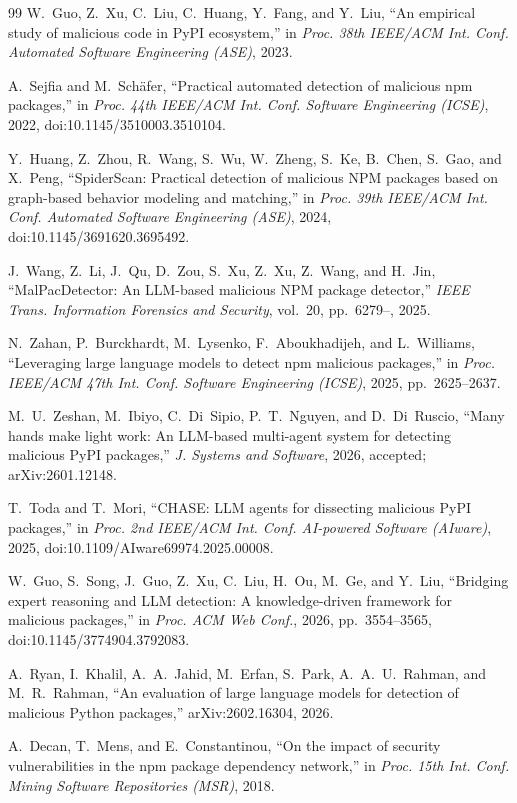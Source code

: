 \documentclass[conference]{IEEEtran}
\begin{document}
\begin{thebibliography}{99}
W.~Guo, Z.~Xu, C.~Liu, C.~Huang, Y.~Fang, and Y.~Liu,
``An empirical study of malicious code in PyPI ecosystem,''
in \emph{Proc. 38th IEEE/ACM Int. Conf. Automated Software Engineering (ASE)}, 2023.

A.~Sejfia and M.~Schäfer, ``Practical automated detection of malicious npm packages,'' in \emph{Proc. 44th
IEEE/ACM Int. Conf. Software Engineering (ICSE)}, 2022, doi:10.1145/3510003.3510104.

Y.~Huang, Z.~Zhou, R.~Wang, S.~Wu, W.~Zheng, S.~Ke, B.~Chen, S.~Gao, and X.~Peng, ``SpiderScan: Practical
detection of malicious NPM packages based on graph-based behavior modeling and matching,'' in \emph{Proc. 39th
IEEE/ACM Int. Conf. Automated Software Engineering (ASE)}, 2024, doi:10.1145/3691620.3695492.

J.~Wang, Z.~Li, J.~Qu, D.~Zou, S.~Xu, Z.~Xu, Z.~Wang, and H.~Jin, ``MalPacDetector: An LLM-based malicious NPM
package detector,'' \emph{IEEE Trans. Information Forensics and Security}, vol.~20, pp.~6279--, 2025.

N.~Zahan, P.~Burckhardt, M.~Lysenko, F.~Aboukhadijeh, and L.~Williams,
``Leveraging large language models to detect npm malicious packages,''
in \emph{Proc. IEEE/ACM 47th Int. Conf. Software Engineering (ICSE)}, 2025, pp.~2625--2637.

M.~U.~Zeshan, M.~Ibiyo, C.~Di~Sipio, P.~T.~Nguyen, and D.~Di~Ruscio,
``Many hands make light work: An LLM-based multi-agent system for detecting malicious PyPI packages,''
\emph{J. Systems and Software}, 2026, accepted; arXiv:2601.12148.

T.~Toda and T.~Mori, ``CHASE: LLM agents for dissecting malicious PyPI packages,'' in \emph{Proc. 2nd IEEE/ACM
Int. Conf. AI-powered Software (AIware)}, 2025, doi:10.1109/AIware69974.2025.00008.

W.~Guo, S.~Song, J.~Guo, Z.~Xu, C.~Liu, H.~Ou, M.~Ge, and Y.~Liu, ``Bridging expert reasoning and LLM detection:
A knowledge-driven framework for malicious packages,'' in \emph{Proc. ACM Web Conf.}, 2026, pp.~3554--3565,
doi:10.1145/3774904.3792083.

A.~Ryan, I.~Khalil, A.~A.~Jahid, M.~Erfan, S.~Park, A.~A.~U.~Rahman, and M.~R.~Rahman,
``An evaluation of large language models for detection of malicious Python packages,'' arXiv:2602.16304, 2026.

A.~Decan, T.~Mens, and E.~Constantinou,
``On the impact of security vulnerabilities in the npm package dependency network,''
in \emph{Proc. 15th Int. Conf. Mining Software Repositories (MSR)}, 2018.


\end{thebibliography}
\end{document}
